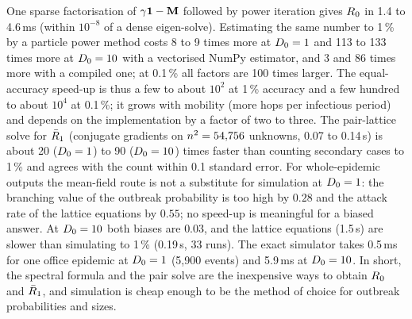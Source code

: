 One sparse factorisation of $\gamma\mathbf{1}-\mathbf{M}$ followed by power iteration gives $R_0$ in 1.4 to 4.6\,ms (within
$10^{-8}$ of a dense eigen-solve). Estimating the same number to 1\,\% by a particle power method costs 8 to 9
times more at $D_0=1$ and 113 to 133 times more at $D_0=10$ with a vectorised NumPy estimator, and 3 and 86
times more with a compiled one; at 0.1\,\% all factors are 100 times larger. The equal-accuracy speed-up is
thus a few to about $10^2$ at 1\,\% accuracy and a few hundred to about $10^4$ at 0.1\,\%; it grows with
mobility (more hops per infectious period) and depends on the implementation by a factor of two to three.
The pair-lattice solve for $\bar{R}_1$ (conjugate gradients on $n^2=54{,}756$ unknowns, 0.07 to 0.14\,s) is
about 20 ($D_0=1$) to 90 ($D_0=10$) times faster than counting secondary cases to 1\,\% and agrees with the
count within 0.1 standard error.
For whole-epidemic outputs the mean-field route is not a substitute for simulation at $D_0=1$: the branching
value of the outbreak probability is too high by $0.28$ and the attack rate of the lattice equations by $0.55$;
no speed-up is meaningful for a biased answer. At $D_0=10$ both biases are $0.03$, and the lattice equations
(1.5\,s) are slower than simulating to 1\,\% (0.19\,s, 33 runs). The exact simulator takes 0.5\,ms for one
office epidemic at $D_0=1$ (5,900 events) and 5.9\,ms at $D_0=10$.
In short, the spectral formula and the pair solve are the inexpensive ways to obtain $R_0$ and $\bar{R}_1$,
and simulation is cheap enough to be the method of choice for outbreak probabilities and sizes.

